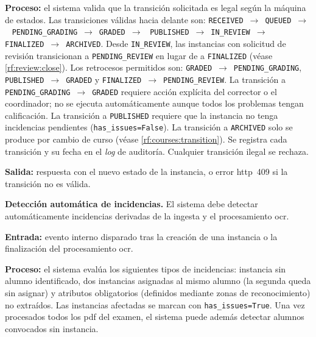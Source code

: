 \begin{functional}
    \textbf{Proceso:} el sistema valida que la transición solicitada es legal según la
    máquina de estados. Las transiciones válidas hacia delante son:
    \texttt{RECEIVED}~$\rightarrow$~\texttt{QUEUED}~$\rightarrow$~%
    \texttt{PENDING\_GRADING}~$\rightarrow$~\texttt{GRADED}~$\rightarrow$~%
    \texttt{PUBLISHED}~$\rightarrow$~\texttt{IN\_REVIEW}~$\rightarrow$~%
    \texttt{FINALIZED}~$\rightarrow$~\texttt{ARCHIVED}.
    Desde \texttt{IN\_REVIEW}, las instancias con solicitud de revisión transicionan a
    \texttt{PENDING\_REVIEW} en lugar de a \texttt{FINALIZED} (véase
    \cref{rf:review:close}). Los retrocesos permitidos son:
    \texttt{GRADED}~$\rightarrow$~\texttt{PENDING\_GRADING},
    \texttt{PUBLISHED}~$\rightarrow$~\texttt{GRADED} y
    \texttt{FINALIZED}~$\rightarrow$~\texttt{PENDING\_REVIEW}.
    La transición a \texttt{PENDING\_GRADING}~$\rightarrow$~\texttt{GRADED} requiere
    acción explícita del corrector o el coordinador; no se ejecuta automáticamente aunque
    todos los problemas tengan calificación. La transición a \texttt{PUBLISHED} requiere
    que la instancia no tenga incidencias pendientes (\texttt{has\_issues=False}). La
    transición a \texttt{ARCHIVED} solo se produce por cambio de curso (véase
    \cref{rf:courses:transition}). Se registra cada transición y su fecha en el
    \textit{log} de auditoría. Cualquier transición ilegal se rechaza.

    \textbf{Salida:} respuesta con el nuevo estado de la instancia, o error \acs{http}~409
    si la transición no es válida.

    \item \textbf{Detección automática de incidencias.} \label{rf:instances:issues}
    El sistema debe detectar automáticamente incidencias derivadas de la ingesta y el
    procesamiento \acs{ocr}.

    \textbf{Entrada:} evento interno disparado tras la creación de una instancia o la
    finalización del procesamiento \acs{ocr}.

    \textbf{Proceso:} el sistema evalúa los siguientes tipos de incidencias: instancia sin
    alumno identificado, dos instancias asignadas al mismo alumno (la segunda queda sin
    asignar) y atributos obligatorios (definidos mediante zonas de reconocimiento) no
    extraídos. Las instancias afectadas se marcan con \texttt{has\_issues=True}. Una vez
    procesados todos los \acs{pdf} del examen, el sistema puede además detectar alumnos
    convocados sin instancia.


\end{functional}
